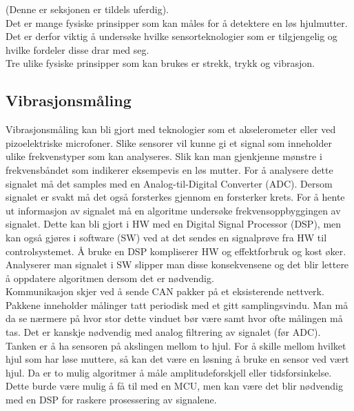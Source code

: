 (Denne er seksjonen er tildels uferdig). \\

Det er mange fysiske prinsipper som kan måles for å detektere en løs hjulmutter.
Det er derfor viktig å undersøke hvilke sensorteknologier som er tilgjengelig og
hvilke fordeler disse drar med seg. \\

Tre ulike fysiske prinsipper som kan brukes er strekk, trykk og vibrasjon. \\

\subsection{Vibrasjonsmåling}

Vibrasjonsmåling kan bli gjort med teknologier som et akselerometer eller ved
pizoelektriske microfoner. Slike sensorer vil kunne gi et signal som inneholder
ulike frekvenstyper som kan analyseres. Slik kan man gjenkjenne mønstre i
frekvensbåndet som indikerer eksempevis en løs mutter. For å analysere dette signalet må det
samples med en Analog-til-Digital Converter (ADC). Dersom signalet er svakt må det også forsterkes gjennom en
forsterker krets. For å hente ut informasjon av signalet må en algoritme undersøke
frekvensoppbyggingen av signalet. Dette kan bli gjort i HW med en Digital Signal Processor (DSP), men kan
også gjøres i software (SW) ved at det sendes en signalprøve fra HW til controlsystemet. Å
bruke en DSP kompliserer HW og effektforbruk og kost øker. Analyserer man
signalet i SW slipper man disse konsekvensene og det blir lettere å oppdatere
algoritmen dersom det er nødvendig. \\

Kommunikasjon skjer ved å sende CAN pakker på et eksisterende nettverk. Pakkene
inneholder målinger tatt periodisk med et gitt samplingsvindu. Man må da se
nærmere på hvor stor dette vinduet bør være samt hvor ofte målingen må tas. Det
er kanskje nødvendig med analog filtrering av signalet (før ADC). \\

Tanken er å ha sensoren på akslingen mellom to hjul. For å skille mellom hvilket
hjul som har løse muttere, så kan det være en løsning å bruke en sensor ved vært
hjul. Da er to mulig algoritmer å måle amplitudeforskjell eller
tidsforsinkelse. Dette burde være mulig å få til med en MCU, men kan være det
blir nødvendig med en DSP for raskere prosessering av signalene. \\

